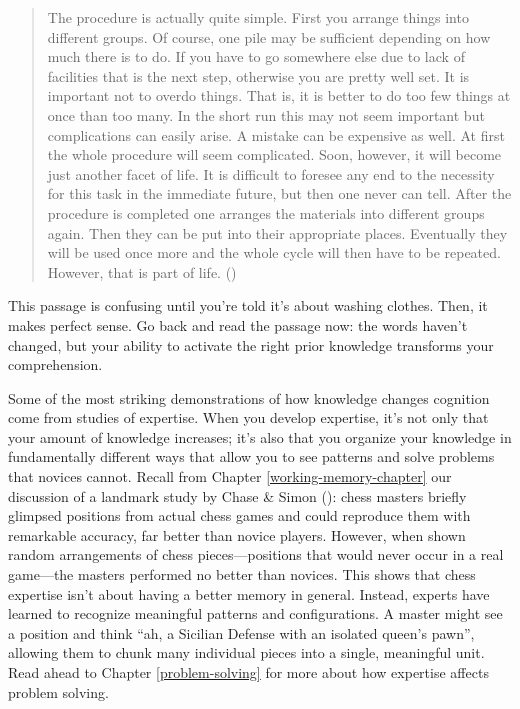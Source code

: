 \documentclass[
]{krantz}
\begin{document}
\begin{quote}
The procedure is actually quite simple. First you arrange things into different groups. Of course, one pile may be sufficient depending on how much there is to do. If you have to go somewhere else due to lack of facilities that is the next step, otherwise you are pretty well set. It is important not to overdo things. That is, it is better to do too few things at once than too many. In the short run this may not seem important but complications can easily arise. A mistake can be expensive as well. At first the whole procedure will seem complicated. Soon, however, it will become just another facet of life. It is difficult to foresee any end to the necessity for this task in the immediate future, but then one never can tell. After the procedure is completed one arranges the materials into different groups again. Then they can be put into their appropriate places. Eventually they will be used once more and the whole cycle will then have to be repeated. However, that is part of life. ()
\end{quote}

This passage is confusing until you're told it's about washing clothes. Then, it makes perfect sense. Go back and read the passage now: the words haven't changed, but your ability to activate the right prior knowledge transforms your comprehension.

Some of the most striking demonstrations of how knowledge changes cognition come from studies of expertise. When you develop expertise, it's not only that your amount of knowledge increases; it's also that you organize your knowledge in fundamentally different ways that allow you to see patterns and solve problems that novices cannot. Recall from Chapter \ref{working-memory-chapter} our discussion of a landmark study by Chase \& Simon (): chess masters briefly glimpsed positions from actual chess games and could reproduce them with remarkable accuracy, far better than novice players. However, when shown random arrangements of chess pieces---positions that would never occur in a real game---the masters performed no better than novices. This shows that chess expertise isn't about having a better memory in general. Instead, experts have learned to recognize meaningful patterns and configurations. A master might see a position and think ``ah, a Sicilian Defense with an isolated queen's pawn'', allowing them to chunk many individual pieces into a single, meaningful unit. Read ahead to Chapter \ref{problem-solving} for more about how expertise affects problem solving.
\end{document}
